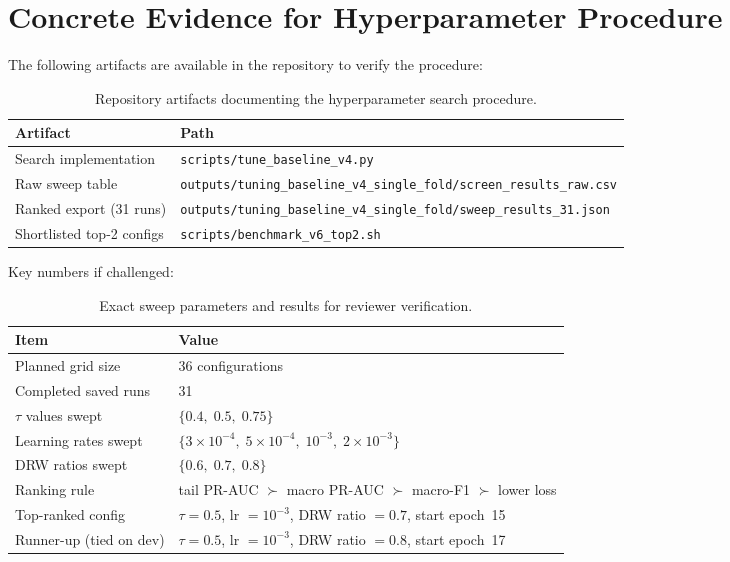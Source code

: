 \documentclass[11pt,a4paper]{article}
\begin{document}
\section{Concrete Evidence for Hyperparameter Procedure}

The following artifacts are available in the repository to verify the procedure:

\begin{table}[h]
\centering
\small
\begin{tabular}{ll}
\toprule
\textbf{Artifact} & \textbf{Path} \\
\midrule
Search implementation  & \texttt{scripts/tune\_baseline\_v4.py} \\
Raw sweep table        & \texttt{outputs/tuning\_baseline\_v4\_single\_fold/screen\_results\_raw.csv} \\
Ranked export (31 runs)& \texttt{outputs/tuning\_baseline\_v4\_single\_fold/sweep\_results\_31.json} \\
Shortlisted top-2 configs & \texttt{scripts/benchmark\_v6\_top2.sh} \\
\bottomrule
\end{tabular}
\caption{Repository artifacts documenting the hyperparameter search procedure.}
\end{table}

\medskip
\noindent Key numbers if challenged:

\begin{table}[h]
\centering
\small
\begin{tabular}{ll}
\toprule
\textbf{Item} & \textbf{Value} \\
\midrule
Planned grid size       & 36 configurations \\
Completed saved runs    & 31 \\
$\tau$ values swept     & $\{0.4,\;0.5,\;0.75\}$ \\
Learning rates swept    & $\{3\!\times\!10^{-4},\;5\!\times\!10^{-4},\;10^{-3},\;2\!\times\!10^{-3}\}$ \\
DRW ratios swept        & $\{0.6,\;0.7,\;0.8\}$ \\
Ranking rule            & tail PR-AUC $\succ$ macro PR-AUC $\succ$ macro-F1 $\succ$ lower loss \\
Top-ranked config       & $\tau=0.5$, lr $= 10^{-3}$, DRW ratio $= 0.7$, start epoch~15 \\
Runner-up (tied on dev) & $\tau=0.5$, lr $= 10^{-3}$, DRW ratio $= 0.8$, start epoch~17 \\
\bottomrule
\end{tabular}
\caption{Exact sweep parameters and results for reviewer verification.}
\end{table}
\end{document}
